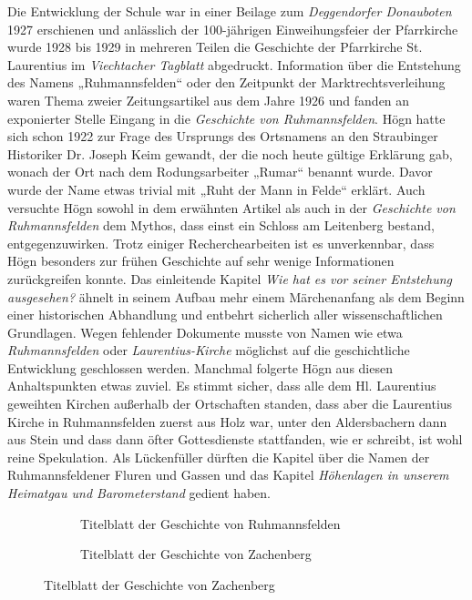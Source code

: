 Die Entwicklung der Schule war in einer Beilage zum \textit{Deggendorfer
Donauboten} 1927 erschienen und anlässlich der 100-jährigen
Einweihungsfeier der Pfarrkirche wurde 1928 bis 1929 in mehreren Teilen
die Geschichte der Pfarrkirche St. Laurentius im \textit{Viechtacher
Tagblatt} abgedruckt. Information über die Entstehung des Namens
„Ruhmannsfelden“ oder den Zeitpunkt der Marktrechtsverleihung waren
Thema zweier Zeitungsartikel aus dem Jahre 1926 und fanden an
exponierter Stelle Eingang in die \textit{Geschichte von
Ruhmannsfelden}. Högn hatte sich schon 1922 zur Frage des Ursprungs des
Ortsnamens an den Straubinger Historiker Dr. Joseph Keim gewandt, der
die noch heute gültige Erklärung gab, wonach der Ort nach dem
Rodungsarbeiter „Rumar“ benannt wurde. Davor wurde der Name etwas
trivial mit „Ruht der Mann in Felde“ erklärt. Auch versuchte Högn
sowohl in dem erwähnten Artikel als auch in der \textit{Geschichte von
Ruhmannsfelden} dem Mythos, dass einst ein Schloss am Leitenberg
bestand, entgegenzuwirken. Trotz einiger Recherchearbeiten ist es
unverkennbar, dass Högn besonders zur frühen Geschichte auf sehr
wenige Informationen zurückgreifen konnte. Das einleitende Kapitel
\textit{Wie hat es vor seiner Entstehung ausgesehen?} ähnelt in seinem
Aufbau mehr einem Märchenanfang als dem Beginn einer historischen
Abhandlung und entbehrt sicherlich aller wissenschaftlichen
Grundlagen. Wegen fehlender Dokumente musste von Namen wie etwa
\textit{Ruhmannsfelden} oder \textit{Laurentius-Kirche} möglichst auf
die geschichtliche Entwicklung geschlossen werden. Manchmal folgerte
Högn aus diesen Anhaltspunkten etwas zuviel. Es stimmt sicher, dass
alle dem Hl. Laurentius geweihten Kirchen außerhalb der Ortschaften
standen, dass aber die Laurentius Kirche in Ruhmannsfelden zuerst aus
Holz war, unter den Aldersbachern dann aus Stein und dass dann öfter
Gottesdienste stattfanden, wie er schreibt, ist wohl reine Spekulation.
Als Lückenfüller dürften die Kapitel über die Namen der
Ruhmannsfeldener Fluren und Gassen und das Kapitel \textit{Höhenlagen
in unserem Heimatgau und Barometerstand} gedient haben.

\begin{figure}
\begin{subfigure}[b]{0.5\linewidth}
\caption{Titelblatt der Geschichte von Ruhmannsfelden}
\end{subfigure}
\begin{subfigure}[b]{0.5\linewidth}
\caption{Titelblatt der Geschichte von Zachenberg}
\end{subfigure}
\end{figure}

